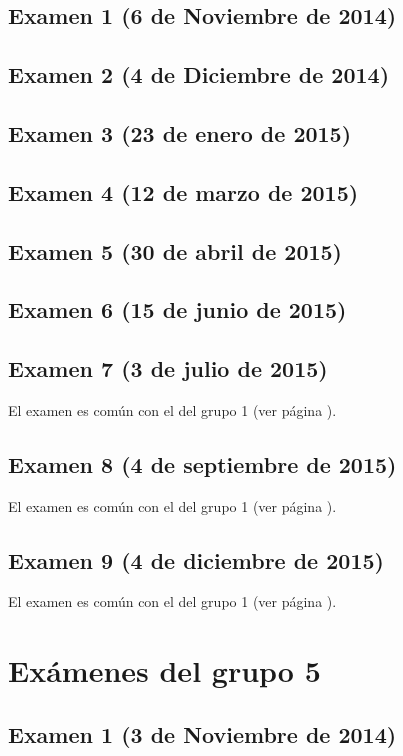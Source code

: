 \documentclass[a4paper,12pt,twoside]{book}
\begin{document}
\section{Examen 1 (6 de Noviembre de 2014)}
\section{Examen 2 (4 de Diciembre de 2014)}
\section{Examen 3 (23 de enero de 2015)}
 \label{examen_14_15_4_3}
\section{Examen 4 (12 de marzo de 2015)}
\section{Examen 5 (30 de abril de 2015)}
\section{Examen 6 (15 de junio de 2015)}
 \label{examen_14_15_4_6}
\section{Examen 7 (3 de julio de 2015)}
El examen es común con el del grupo 1 (ver página \pageref{examen_14_15_1_7}).
\section{Examen 8 (4 de septiembre de 2015)}
El examen es común con el del grupo 1 (ver página \pageref{examen_14_15_1_7}).
\section{Examen 9 (4 de diciembre de 2015)}
El examen es común con el del grupo 1 (ver página \pageref{examen_14_15_1_9}).

\chapter{Exámenes del grupo 5} 
\section{Examen 1 (3 de Noviembre de 2014)}
\end{document}
